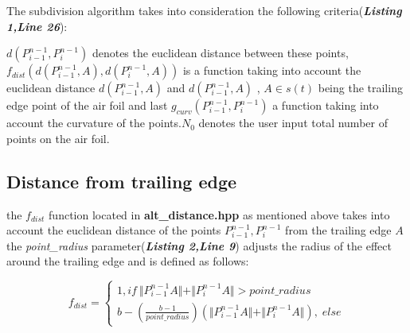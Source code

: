 \documentclass[12pt,a4paper]{article}
\begin{document}
\vspace{5pt}
The subdivision algorithm takes into consideration the following criteria(\textbf{\textit{Listing 1,Line 26}}): 

\begin{frame}

\begin{minipage}{1\linewidth}
\begin{center}

\begin{algorithm}[H]


\end{algorithm}

\end{center}
\end{minipage}

\end{frame}




\vspace{5pt}
$d(P_{i-1}^{n-1},P_{i}^{n-1})$ denotes the euclidean distance between  these points,\\$f_{dist}(d(P_{i-1}^{n-1},A),d(P_{i}^{n-1},A))$ is a function taking into account the euclidean distance $d(P_{i-1}^{n-1},A)$ and $d(P_{i-1}^{n-1},A)$ , $A \in s(t)$ being the trailing edge point of the air foil and last $g_{curv}(P_{i-1}^{n-1},P_{i}^{n-1}) $ a function taking into account the curvature of the points.${N_{0}}$ denotes the user input  total number of points on the air foil.






 


 
 \subsection{Distance from trailing edge}
 
the $f_{dist}$ function located in \textbf{alt\_distance.hpp}  as mentioned above takes into account the euclidean distance of the points  $P_{i-1}^{n-1},P_{i}^{n-1}$ from the trailing edge $A$ the \textit{point\_{radius}} parameter(\textbf{\textit{Listing 2,Line 9}}) adjusts the radius of the effect around the trailing edge and is defined as follows:
 
 
$$ f_{dist}=\begin{cases} 1 , if \:  \Vert P_{i-1}^{n-1}A \Vert + \Vert P_{i}^{n-1}A \Vert >point\_radius \\ b-(\frac{b-1}{point\_radius})(\Vert P_{i-1}^{n-1}A \Vert + \Vert P_{i}^{n-1}A \Vert) , \;else \end{cases}$$ 
 
\end{document}
